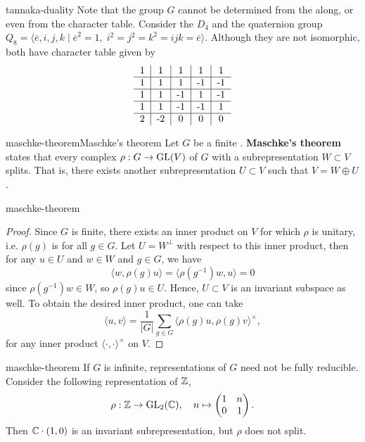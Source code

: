 \begin{example}{tannaka-duality}
    Note that the group $G$ cannot be determined from the  along, or even from the character table. Consider the  $D_4$ and the quaternion group $Q_8 = \langle \overline{e}, i, j, k \;|\; \overline{e}^2 = 1, \; i^2 = j^2 = k^2 = ijk = \overline{e} \rangle$. Although they are not isomorphic, both have character table given by
    \[ \begin{tabular}{c|c|c|c|c}
        1 & 1 & 1 & 1 & 1 \\ \hline
        1 & 1 & 1 & -1 & -1 \\ \hline
        1 & 1 & -1 & 1 & -1 \\ \hline
        1 & 1 & -1 & -1 & 1 \\ \hline
        2 & -2 & 0 & 0 & 0
    \end{tabular} \]
\end{example}

\begin{topic}{maschke-theorem}{Maschke's theorem}
    Let $G$ be a finite . \textbf{Maschke's theorem} states that every complex  $\rho : G \to \textup{GL}(V)$ of $G$ with a subrepresentation $W \subset V$ splits. That is, there exists another subrepresentation $U \subset V$ such that $V = W \oplus U$.
\end{topic}

\begin{example}{maschke-theorem}
    \begin{proof}
        Since $G$ is finite, there exists an inner product on $V$ for which $\rho$ is unitary, i.e. $\rho(g)$ is  for all $g \in G$. Let $U = W^\perp$ with respect to this inner product, then for any $u \in U$ and $w \in W$ and $g \in G$, we have
        \[ \langle w, \rho(g) u \rangle = \langle \rho(g^{-1}) w, u \rangle = 0 \]
        since $\rho(g^{-1}) w \in W$, so $\rho(g) u \in U$. Hence, $U \subset V$ is an invariant subspace as well. To obtain the desired inner product, one can take
        \[ \langle u, v \rangle = \frac{1}{|G|} \sum_{g \in G} \langle \rho(g) u, \rho(g) v \rangle^\times , \]
        for any inner product $\langle \cdot, \cdot \rangle^\times$ on $V$.
    \end{proof}
\end{example}

\begin{example}{maschke-theorem}
    If $G$ is infinite, representations of $G$ need not be fully reducible. Consider the following representation of $\mathbb{Z}$,
    \[ \rho : \mathbb{Z} \to \textup{GL}_2(\mathbb{C}), \quad n \mapsto \begin{pmatrix} 1 & n \\ 0 & 1 \end{pmatrix} . \]
    Then $\mathbb{C} \cdot (1, 0)$ is an invariant subrepresentation, but $\rho$ does not split.
\end{example}
